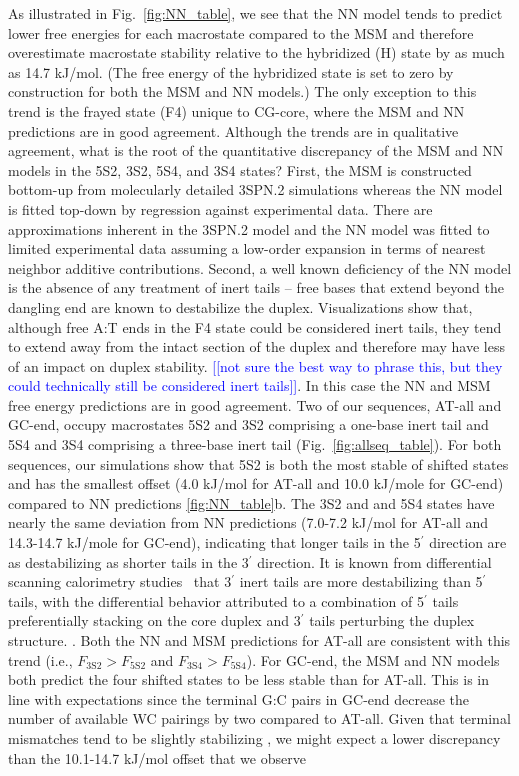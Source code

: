 \documentclass[journal=jpcbfk,manuscript=article]{achemso}
\newcommand*{\noteb}[1]{\textcolor{blue}{[[#1]]}}		%
\begin{document}
As illustrated in Fig.~\ref{fig:NN_table}, we see that the NN model tends to predict lower free energies for each macrostate compared to the MSM and therefore overestimate macrostate stability relative to the hybridized (H) state by as much as 14.7 kJ/mol. (The free energy of the hybridized state is set to zero by construction for both the MSM and NN models.) The only exception to this trend is the frayed state (F4) unique to CG-core, where the MSM and NN predictions are in good agreement. Although the trends are in qualitative agreement, what is the root of the quantitative discrepancy of the MSM and NN models in the 5S2, 3S2, 5S4, and 3S4 states? First, the MSM is constructed bottom-up from molecularly detailed 3SPN.2 simulations whereas the NN model is fitted top-down by regression against experimental data. There are approximations inherent in the 3SPN.2 model and the NN model was fitted to limited experimental data assuming a low-order expansion in terms of nearest neighbor additive contributions. Second, a well known deficiency of the NN model is the absence of any treatment of inert tails -- free bases that extend beyond the dangling end are known to destabilize the duplex.\citep{Michele2014EHybridization} Visualizations show that, although free A:T ends in the F4 state could be considered inert tails, they tend to extend away from the intact section of the duplex and therefore may have less of an impact on duplex stability. \noteb{not sure the best way to phrase this, but they could technically still be considered inert tails}. In this case the NN and MSM free energy predictions are in good agreement. Two of our sequences, AT-all and GC-end, occupy macrostates 5S2 and 3S2 comprising a one-base inert tail and 5S4 and 3S4 comprising a three-base inert tail (Fig.~\ref{fig:allseq_table}). For both sequences, our simulations show that 5S2 is both the most stable of shifted states and has the smallest offset (4.0 kJ/mol for AT-all and 10.0 kJ/mole for GC-end) compared to NN predictions \ref{fig:NN_table}b. The 3S2 and and 5S4 states have nearly the same deviation from NN predictions (7.0-7.2 kJ/mol for AT-all and 14.3-14.7 kJ/mole for GC-end), indicating that longer tails in the 5$^\prime$ direction are as destabilizing as shorter tails in the 3$^\prime$ direction. It is known from differential scanning calorimetry studies~\citep{Dickman2012ThermodynamicDNAs} that 3$^\prime$ inert tails are more destabilizing than 5$^\prime$ tails, with the differential behavior attributed to a combination of 5$^\prime$ tails preferentially stacking on the core duplex and 3$^\prime$ tails perturbing the duplex structure. \citep{Doktycz1990ThermodynamicATGC, Dickman2012ThermodynamicDNAs, Michele2014EHybridization}. Both the NN and MSM predictions for AT-all are consistent with this trend (i.e., $F_\mathrm{3S2} > F_\mathrm{5S2}$ and $F_\mathrm{3S4} > F_\mathrm{5S4}$). For GC-end, the MSM and NN models both predict the four shifted states to be less stable than for AT-all. This is in line with expectations since the terminal G:C pairs in GC-end decrease the number of available WC pairings by two compared to AT-all. Given that terminal mismatches tend to be slightly stabilizing \citep{Santalucia2004TM}, we might expect a lower discrepancy than the  10.1-14.7 kJ/mol offset that we observe 
\end{document}
